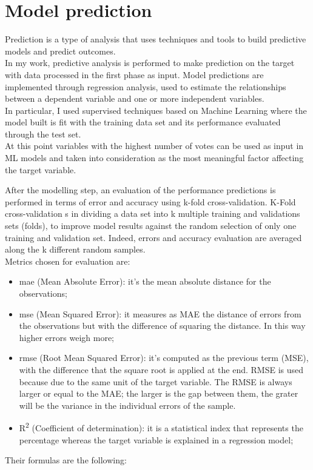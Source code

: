\section{Model prediction}
Prediction is a type of analysis that uses techniques and tools to build predictive models and predict outcomes. \\
In my work, predictive analysis is performed to make prediction on the target with data processed in the first phase as input.\newline
Model predictions are implemented through regression analysis, used to estimate the relationships between a dependent variable and one or more independent variables.\\
In particular, I used supervised techniques based on Machine Learning where the model built is fit with the training data set and its performance evaluated through the test set. 
\\
At this point variables with the highest number of votes can be used as input in ML models and taken into consideration as the most meaningful factor affecting the target variable.
\par
After the modelling step, an evaluation of the performance predictions is performed in terms of error and accuracy using k-fold cross-validation.\newline
K-Fold cross-validation s in dividing a data set into k multiple training and validations sets (folds), to improve model results against the random selection of only one training and validation set. Indeed, errors and accuracy evaluation are averaged along the k different random samples.\\
Metrics chosen for evaluation are:
\begin{itemize}
    \item \acrshort{mae} (Mean Absolute Error): it's the mean absolute distance for the observations;
    \item \acrshort{mse} (Mean Squared Error): it measures as MAE the distance of errors from the observations but with the difference of squaring the distance. In this way higher errors weigh more;
    \item \acrshort{rmse} (Root Mean Squared Error): it's computed as the previous term (MSE), with the difference that the square root is applied at the end. RMSE is used because due to the same unit of the target variable.
    The RMSE is always larger or equal to the MAE; the larger is the gap between them, the grater will be the variance in the individual errors of the sample.
    \item R\textsuperscript{2} (Coefficient of determination): it is a statistical index that represents the percentage whereas the target variable is explained in a regression model;
\end{itemize} 
Their formulas are the following:
